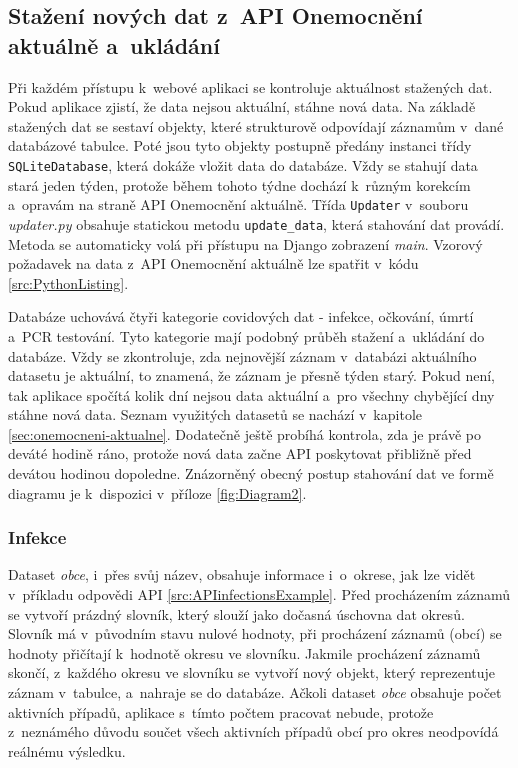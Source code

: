 \subsection{Stažení nových dat z~API Onemocnění aktuálně a~ukládání}

Při každém přístupu k~webové aplikaci se kontroluje aktuálnost stažených dat. Pokud aplikace zjistí, že data nejsou aktuální, stáhne nová data. Na základě stažených dat se sestaví objekty, které strukturově odpovídají záznamům v~dané databázové tabulce. Poté jsou tyto objekty postupně předány instanci třídy \lstinline{SQLiteDatabase}, která dokáže vložit data do databáze. Vždy se stahují data stará jeden týden, protože během tohoto týdne dochází k~různým korekcím a~opravám na straně API Onemocnění aktuálně. Třída \lstinline{Updater} v~souboru \emph{updater.py} obsahuje statickou metodu \lstinline{update_data}, která stahování dat provádí. Metoda se automaticky volá při přístupu na Django zobrazení \emph{main}. Vzorový požadavek na data z~API Onemocnění aktuálně lze spatřit v~kódu \ref{src:PythonListing}.

Databáze uchovává čtyři kategorie covidových dat - infekce, očkování, úmrtí a~PCR testování. Tyto kategorie mají podobný průběh stažení a~ukládání do databáze. Vždy se zkontroluje, zda nejnovější záznam v~databázi aktuálního datasetu je aktuální, to znamená, že záznam je přesně týden starý. Pokud není, tak aplikace spočítá kolik dní nejsou data aktuální a~pro všechny chybějící dny stáhne nová data. Seznam využitých datasetů se nachází v~kapitole \ref{sec:onemocneni-aktualne}. Dodatečně ještě probíhá kontrola, zda je právě po deváté hodině ráno, protože nová data začne API poskytovat přibližně před devátou hodinou dopoledne. Znázorněný obecný postup stahování dat ve formě diagramu je k~dispozici v~příloze \ref{fig:Diagram2}.

\subsubsection*{Infekce}

Dataset \emph{obce}, i~přes svůj název, obsahuje informace i~o~okrese, jak lze vidět v~příkladu odpovědi API \ref{src:APIinfectionsExample}. Před procházením záznamů se vytvoří prázdný slovník, který slouží jako dočasná úschovna dat okresů. Slovník má v~původním stavu nulové hodnoty, při procházení záznamů (obcí) se hodnoty přičítají k~hodnotě okresu ve slovníku. Jakmile procházení záznamů skončí, z~každého okresu ve slovníku se vytvoří nový objekt, který reprezentuje záznam v~tabulce, a~nahraje se do databáze. Ačkoli dataset \emph{obce} obsahuje počet aktivních případů, aplikace s~tímto počtem pracovat nebude, protože z~neznámého důvodu součet všech aktivních případů obcí pro okres neodpovídá reálnému výsledku.


